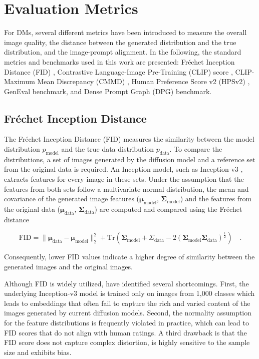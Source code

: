 \section{Evaluation Metrics}
\label{sec:EvalMetrics}
For \gls{DM}s, several different metrics have been introduced to measure the overall image quality, the distance between the generated distribution and the true distribution, and the image-prompt alignment. In the following, the standard metrics and benchmarks used in this work are presented: Fr\'echet Inception Distance (\gls{FID}) \cite{FID}, Contrastive Language-Image Pre-Training (\gls{CLIP}) score \cite{CLIP}, CLIP-Maximum Mean Discrepancy (\gls{CMMD}) \cite{cmmd}, Human Preference Score v2 (\gls{HPSv2}) \cite{HPSv2}, GenEval \cite{ghosh2023geneval} benchmark, and Dense Prompt Graph (\gls{DPG}) \cite{DPG} benchmark.



\subsection{Fr\'echet Inception Distance}
The Fr\'echet Inception Distance (\gls{FID}) \cite{FID} measures the similarity between the model distribution $p_\text{model}$ and the true data distribution $p_\text{data}$. To compare the distributions, a set of images generated by the diffusion model and a reference set from the original data is required. An Inception model, such as Inception-v3 \cite{szegedy2016rethinking}, extracts features for every image in these sets. Under the assumption that the features from both sets follow a multivariate normal distribution, the mean and covariance of the generated image features ($\boldsymbol{\mu}_\text{model}$, $\boldsymbol{\Sigma}_\text{model}$) and the features from the original data ($\boldsymbol{\mu}_\text{data}$, $\boldsymbol{\Sigma}_\text{data}$) are computed and compared using the Fr\'echet distance \cite{dowson1982frechet}

\begin{equation}
	\text{FID} = \| \boldsymbol{\mu}_\text{data} - \boldsymbol{\mu}_\text{model}\|_2^2 + \text{Tr}\left(\boldsymbol{\Sigma}_\text{model} + \Sigma_\text{data} - 2 \left(\boldsymbol{\Sigma}_\text{model}\boldsymbol{\Sigma}_\text{data}\right)^{\frac{1}{2}}\right) \quad.
\end{equation}

Consequently, lower \gls{FID} values indicate a higher degree of similarity between the generated images and the original images. 

Although \gls{FID} is widely utilized, \cite{cmmd} have identified several shortcomings. First, the underlying Inception-v3 model is trained only on images from 1,000 classes which leads to embeddings that often fail to capture the rich and varied content of the images generated by current diffusion models. Second, the normality assumption for the feature distributions is frequently violated in practice, which can lead to \gls{FID} scores that do not align with human ratings. A third drawback is that the \gls{FID} score does not capture complex distortion, is highly sensitive to the sample size and exhibits bias. 


